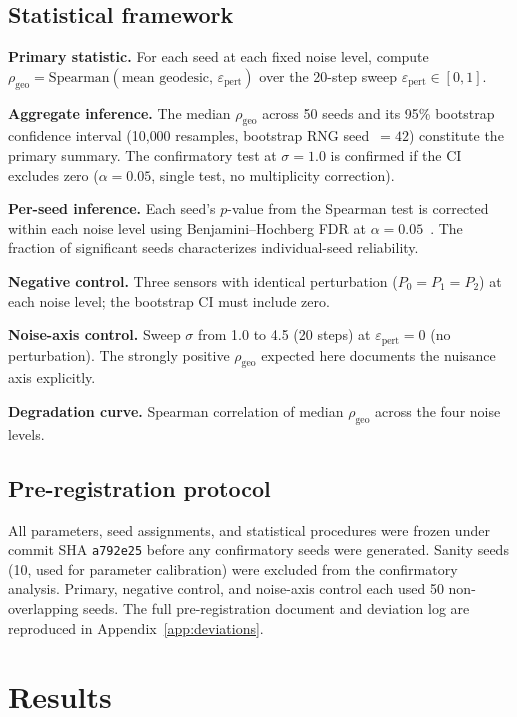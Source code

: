 \documentclass[11pt]{article}
\newcommand{\eps}{\varepsilon}
\newcommand{\epspert}{\eps_\mathrm{pert}}
\newcommand{\rhogeo}{\rho_\mathrm{geo}}
\begin{document}
\subsection{Statistical framework}

\textbf{Primary statistic.}  For each seed at each fixed noise
level, compute $\rhogeo = \mathrm{Spearman}(\text{mean geodesic},
\, \epspert)$ over the 20-step sweep $\epspert \in [0, 1]$.

\textbf{Aggregate inference.}  The median $\rhogeo$ across 50
seeds and its 95\% bootstrap confidence interval
\citep{efron1979bootstrap} (10{,}000 resamples, bootstrap RNG
seed~$= 42$) constitute the primary summary.  The confirmatory
test at $\sigma = 1.0$ is confirmed if the CI excludes zero
($\alpha = 0.05$, single test, no multiplicity correction).

\textbf{Per-seed inference.}  Each seed's $p$-value from the
Spearman test is corrected within each noise level using
Benjamini--Hochberg FDR at $\alpha =
0.05$~\citep{benjamini1995controlling}.  The fraction of
significant seeds characterizes individual-seed reliability.

\textbf{Negative control.}  Three sensors with identical
perturbation ($P_0 = P_1 = P_2$) at each noise level; the
bootstrap CI must include zero.

\textbf{Noise-axis control.}  Sweep $\sigma$ from 1.0 to 4.5
(20 steps) at $\epspert = 0$ (no perturbation).  The strongly
positive $\rhogeo$ expected here documents the nuisance axis
explicitly.

\textbf{Degradation curve.}  Spearman correlation of median
$\rhogeo$ across the four noise levels.

\subsection{Pre-registration protocol}

All parameters, seed assignments, and statistical procedures were
frozen under commit SHA \texttt{a792e25} before any confirmatory
seeds were generated.  Sanity seeds (10, used for parameter
calibration) were excluded from the confirmatory analysis.
Primary, negative control, and noise-axis control each used 50
non-overlapping seeds.  The full pre-registration document and
deviation log are reproduced in Appendix~\ref{app:deviations}.

\section{Results}
\label{sec:results}
\end{document}
